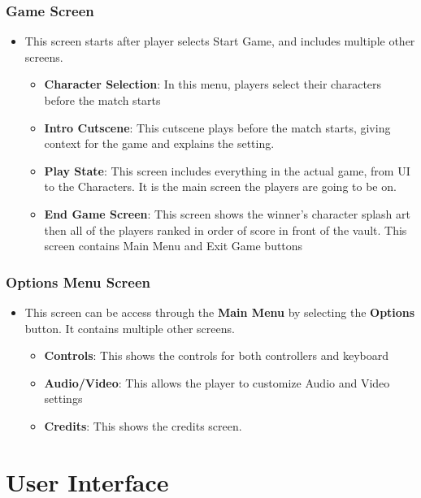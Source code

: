 \documentclass[10pt]{report}
\begin{document}
\subsection{Game Screen}

\begin{itemize}
    \item This screen starts after player selects Start Game, and includes multiple other screens.
    \begin{itemize}    
        \item \textbf{Character Selection}: In this menu, players select their characters before the match starts
        \item \textbf{Intro Cutscene}: This cutscene plays before the match starts, giving context for the game and explains the setting.
        \item \textbf{Play State}: This screen includes everything in the actual game, from UI to the Characters. It is the main screen the players are going to be on.
        \item \textbf{End Game Screen}: This screen shows the winner’s character splash art then all of the players ranked in order of score in front of the vault. This screen contains Main Menu and Exit Game buttons
    \end{itemize}
\end{itemize}

\subsection{Options Menu Screen}
\begin{itemize}
    \item This screen can be access through the \textbf{Main Menu} by selecting the \textbf{Options} button. It contains multiple other screens.
    \begin{itemize}
        \item \textbf{Controls}: This shows the controls for both controllers and keyboard
        \item \textbf{Audio/Video}: This allows the player to customize Audio and Video settings
        \item \textbf{Credits}: This shows the credits screen.    
    \end{itemize}
\end{itemize}

\chapter{User Interface}
\end{document}
